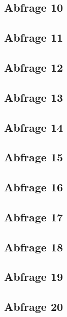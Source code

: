 \subsection*{Abfrage 10}

\subsection*{Abfrage 11}

\subsection*{Abfrage 12}

\subsection*{Abfrage 13}

\subsection*{Abfrage 14}

\subsection*{Abfrage 15}

\subsection*{Abfrage 16}

\subsection*{Abfrage 17}

\subsection*{Abfrage 18}

\subsection*{Abfrage 19}

\subsection*{Abfrage 20}

